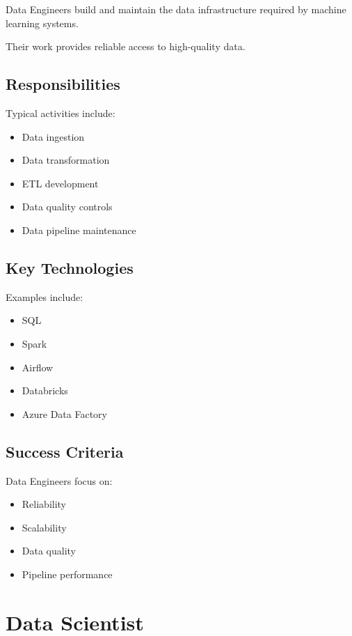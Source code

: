Data Engineers build and maintain the data infrastructure required by machine learning systems.

Their work provides reliable access to high-quality data.

\subsection{Responsibilities}

Typical activities include:

\begin{itemize}
    \item Data ingestion
    \item Data transformation
    \item ETL development
    \item Data quality controls
    \item Data pipeline maintenance
\end{itemize}

\subsection{Key Technologies}

Examples include:

\begin{itemize}
    \item SQL
    \item Spark
    \item Airflow
    \item Databricks
    \item Azure Data Factory
\end{itemize}

\subsection{Success Criteria}

Data Engineers focus on:

\begin{itemize}
    \item Reliability
    \item Scalability
    \item Data quality
    \item Pipeline performance
\end{itemize}

\section{Data Scientist}

